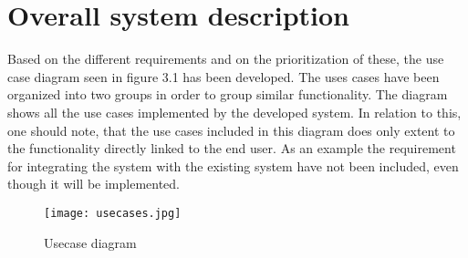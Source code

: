 \section{Overall system description}
Based on the different requirements and on the prioritization of these, the use case diagram seen in figure 3.1 has been developed. The uses cases have been organized into two groups in order to group similar functionality. The diagram shows all the use cases implemented by the developed system. In relation to this, one should note, that the use cases included in this diagram does only extent to the functionality directly linked to the end user. As an example the requirement for integrating the system with the existing system have not been included, even though it will be implemented.
\begin{figure}
\begin{center}
\texttt{[image: usecases.jpg]}
\end{center}
\caption{Usecase diagram}
\end{figure}
